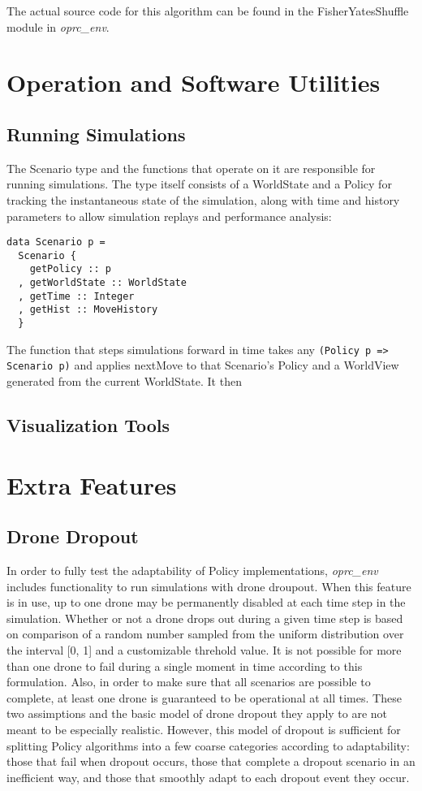The actual source code for this algorithm can be found in the FisherYatesShuffle module in \textit{oprc\_env}.

\section{Operation and Software Utilities}

\subsection{Running Simulations}

The Scenario type and the functions that operate on it are responsible for running simulations. The type itself consists of a WorldState and a Policy for tracking the instantaneous state of the simulation, along with time and history parameters to allow simulation replays and performance analysis:

\begin{verbatim}
data Scenario p =
  Scenario {
    getPolicy :: p
  , getWorldState :: WorldState
  , getTime :: Integer
  , getHist :: MoveHistory
  }
\end{verbatim}

The function that steps simulations forward in time takes any \verb|(Policy p => Scenario p)| and applies nextMove to that Scenario's Policy and a WorldView generated from the current WorldState. It then 

\subsection{Visualization Tools}

\section{Extra Features}

\subsection{Drone Dropout}

In order to fully test the adaptability of Policy implementations, \textit{oprc\_env} includes functionality to run simulations with drone droupout. When this feature is in use, up to one drone may be permanently disabled at each time step in the simulation. Whether or not a drone drops out during a given time step is based on comparison of a random number sampled from the uniform distribution over the interval [0, 1] and a customizable threhold value. It is not possible for more than one drone to fail during a single moment in time according to this formulation. Also, in order to make sure that all scenarios are possible to complete, at least one drone is guaranteed to be operational at all times. These two assimptions and the basic model of drone dropout they apply to are not meant to be especially realistic. However, this model of dropout is sufficient for splitting Policy algorithms into a few coarse categories according to adaptability: those that fail when dropout occurs, those that complete a dropout scenario in an inefficient way, and those that smoothly adapt to each dropout event they occur.

